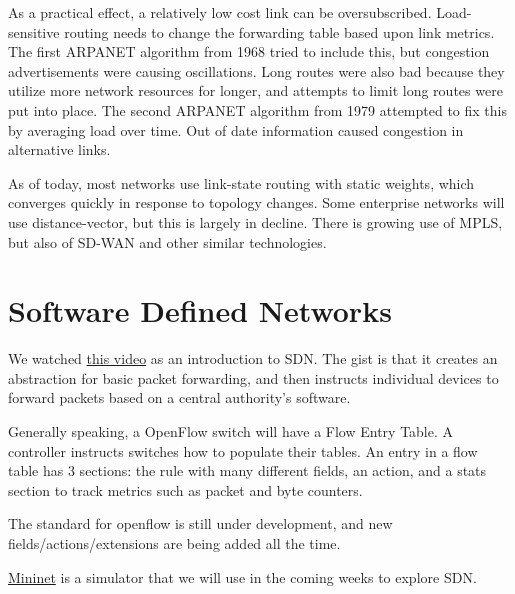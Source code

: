 \documentclass{idc_msc}
\begin{document}
As a practical effect, a relatively low cost link can be oversubscribed.
Load-sensitive routing needs to change the forwarding table based upon link metrics.
The first ARPANET algorithm from 1968 tried to include this, but congestion advertisements were causing oscillations.
Long routes were also bad because they utilize more network resources for longer, and attempts to limit long routes were put into place.
The second ARPANET algorithm from 1979 attempted to fix this by averaging load over time.
Out of date information caused congestion in alternative links.

As of today, most networks use link-state routing with static weights, which converges quickly in response to topology changes.
Some enterprise networks will use distance-vector, but this is largely in decline.
There is growing use of MPLS, but also of SD-WAN and other similar technologies.

\section{Software Defined Networks}

We watched \href{https://www.youtube.com/watch?v=eXsCQdshMr4}{this video} as an introduction to SDN.
The gist is that it creates an abstraction for basic packet forwarding, and then instructs individual devices to forward packets based on a central authority's software.

Generally speaking, a OpenFlow switch will have a Flow Entry Table.
A controller instructs switches how to populate their tables.
An entry in a flow table has 3 sections: the rule with many different fields, an action, and a stats section to track metrics such as packet and byte counters.

The standard for openflow is still under development, and new fields/actions/extensions are being added all the time.

\href{http://mininet.org/}{Mininet} is a simulator that we will use in the coming weeks to explore SDN.
\end{document}
